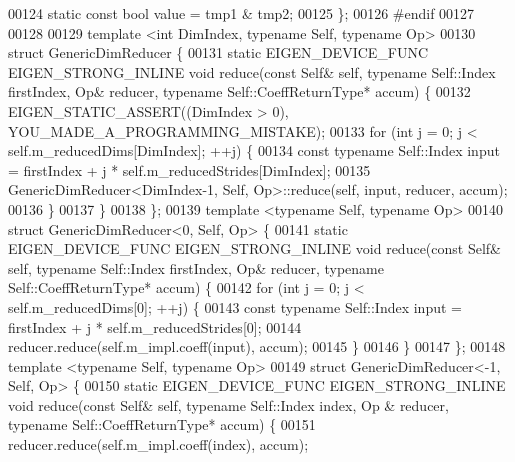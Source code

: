 \begin{DoxyCode}
00124   \textcolor{keyword}{static} \textcolor{keyword}{const} \textcolor{keywordtype}{bool} value = tmp1 & tmp2;
00125 \};
00126 \textcolor{preprocessor}{#endif}
00127 
00128 
00129 \textcolor{keyword}{template} <\textcolor{keywordtype}{int} DimIndex, \textcolor{keyword}{typename} Self, \textcolor{keyword}{typename} Op>
00130 \textcolor{keyword}{struct }GenericDimReducer \{
00131   \textcolor{keyword}{static} EIGEN\_DEVICE\_FUNC EIGEN\_STRONG\_INLINE \textcolor{keywordtype}{void} reduce(\textcolor{keyword}{const} Self& \textcolor{keyword}{self}, \textcolor{keyword}{typename} Self::Index 
      firstIndex, Op& reducer, \textcolor{keyword}{typename} Self::CoeffReturnType* accum) \{
00132     EIGEN\_STATIC\_ASSERT((DimIndex > 0), YOU\_MADE\_A\_PROGRAMMING\_MISTAKE);
00133     \textcolor{keywordflow}{for} (\textcolor{keywordtype}{int} j = 0; j < \textcolor{keyword}{self}.m\_reducedDims[DimIndex]; ++j) \{
00134       \textcolor{keyword}{const} \textcolor{keyword}{typename} Self::Index input = firstIndex + j * \textcolor{keyword}{self}.m\_reducedStrides[DimIndex];
00135       GenericDimReducer<DimIndex-1, Self, Op>::reduce(\textcolor{keyword}{self}, input, reducer, accum);
00136     \}
00137   \}
00138 \};
00139 \textcolor{keyword}{template} <\textcolor{keyword}{typename} Self, \textcolor{keyword}{typename} Op>
00140 \textcolor{keyword}{struct }GenericDimReducer<0, Self, Op> \{
00141   \textcolor{keyword}{static} EIGEN\_DEVICE\_FUNC EIGEN\_STRONG\_INLINE \textcolor{keywordtype}{void} reduce(\textcolor{keyword}{const} Self& \textcolor{keyword}{self}, \textcolor{keyword}{typename} Self::Index 
      firstIndex, Op& reducer, \textcolor{keyword}{typename} Self::CoeffReturnType* accum) \{
00142     \textcolor{keywordflow}{for} (\textcolor{keywordtype}{int} j = 0; j < \textcolor{keyword}{self}.m\_reducedDims[0]; ++j) \{
00143       \textcolor{keyword}{const} \textcolor{keyword}{typename} Self::Index input = firstIndex + j * \textcolor{keyword}{self}.m\_reducedStrides[0];
00144       reducer.reduce(\textcolor{keyword}{self}.m\_impl.coeff(input), accum);
00145     \}
00146   \}
00147 \};
00148 \textcolor{keyword}{template} <\textcolor{keyword}{typename} Self, \textcolor{keyword}{typename} Op>
00149 \textcolor{keyword}{struct }GenericDimReducer<-1, Self, Op> \{
00150   \textcolor{keyword}{static} EIGEN\_DEVICE\_FUNC EIGEN\_STRONG\_INLINE \textcolor{keywordtype}{void} reduce(\textcolor{keyword}{const} Self& \textcolor{keyword}{self}, \textcolor{keyword}{typename} Self::Index index, Op
      & reducer, \textcolor{keyword}{typename} Self::CoeffReturnType* accum) \{
00151     reducer.reduce(\textcolor{keyword}{self}.m\_impl.coeff(index), accum);

\end{DoxyCode}
